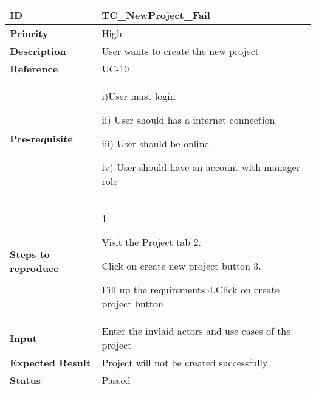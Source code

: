 \begin{center}
    \begin{tabularx}{\textwidth}{|l|X|}
        \hline
        \textbf{ID}                 & TC\_NewProject\_Fail                                  \\
        \hline
        \textbf{Priority}           & High                                                  \\
        \hline
        \textbf{Description}        & User wants to create the new project                  \\
        \hline
        \textbf{Reference}          & UC-10                                                 \\
        \hline
        \textbf{Pre-requisite}      & i)User must login

        ii) User should has a internet connection

        iii) User should be online

        iv) User should have an account with manager role                                   \\
        \hline
        \textbf{Steps to reproduce} & 1.

        Visit the Project tab 2.

        Click on create new project button 3.

        Fill up the requirements 4.Click on create project button                           \\
        \hline
        \textbf{Input}              & Enter the invlaid actors and use cases of the project \\
        \hline
        \textbf{Expected Result}    & Project will not be created successfully              \\
        \hline
        \textbf{Status}             & Passed                                                \\
        \hline
    \end{tabularx}
\end{center}
\newpage

